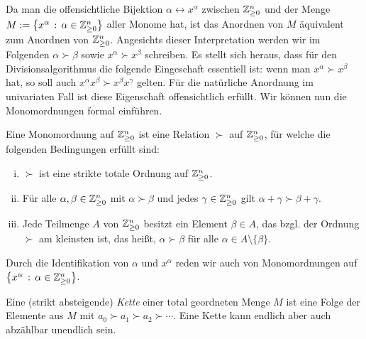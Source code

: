 \documentclass[11pt]{article}
\numberwithin{equation}{section}
\begin{document}
Da man die offensichtliche Bijektion $\alpha \leftrightarrow x^\alpha$ zwischen $\mathbb{Z}_{\ge 0}^n$ und der Menge $M:= \left\{  x^\alpha \,:\,  \alpha \in \mathbb{Z}_{\ge 0}^n \right\}$ aller Monome hat, ist das Anordnen von $M$ äquivalent zum Anordnen von $\mathbb{Z}_{\ge 0}^n$. Angesichts dieser Interpretation werden wir 
im Folgenden $\alpha \succ \beta$ sowie $x^\alpha \succ x^\beta$ schreiben. Es stellt sich heraus, dass für den Divisionsalgorithmus die folgende Eingeschaft essentiell ist: wenn man $x^\alpha \succ x^\beta$ hat, so soll auch $x^\alpha x^\beta \succ x^\beta x^\gamma$ gelten. Für die natürliche Anordnung im univariaten Fall ist diese Eigenschaft offensichtlich erfüllt. Wir können nun die Monomordnungen formal einführen. 

\begin{definition} \label{def:monom:ordnung}
	Eine Monomordnung auf $\mathbb{Z}_{\ge 0}^n$ ist eine Relation $\succ$ auf $\mathbb{Z}_{\ge 0}^n$, für welche die folgenden Bedingungen erfüllt sind: 
	\begin{enumerate}[(i)]
		\item $\succ$ ist eine strikte totale Ordnung auf $\mathbb{Z}_{\ge 0}^n$. 
		\item Für alle $\alpha, \beta \in \mathbb{Z}_{\ge 0}^n$ mit $\alpha \succ \beta$ und jedes $\gamma \in \mathbb{Z}_{\ge 0}^n$ gilt $\alpha + \gamma \succ \beta + \gamma$. 
		\item Jede Teilmenge $A$ von $\mathbb{Z}_{\ge 0}^n$ besitzt ein Element $\beta \in A$, das bzgl. der Ordnung $\succ$ am kleinsten ist, das heißt, $\alpha \succ \beta$ für alle $\alpha \in A \setminus \{\beta\}$. 
	\end{enumerate} 
	Durch die Identifikation von $\alpha$ und $x^\alpha$ reden wir auch von Monomordnungen auf $\left\{ x^\alpha \,:\, \alpha \in \mathbb{Z}_{\ge 0}^n \right\}$. 
\end{definition} 

\begin{definition} 
Eine (strikt absteigende) \emph{Kette} einer total geordneten Menge $M$ ist eine Folge der Elemente aus $M$ mit $a_0 \succ a_1 \succ a_2 \succ \cdots$. Eine Kette kann endlich aber auch abzählbar unendlich sein.  
\end{definition} 
\end{document}
